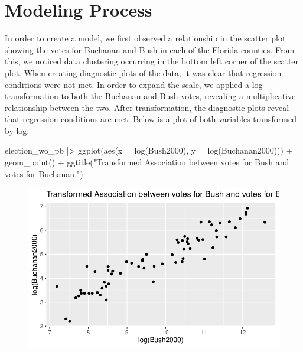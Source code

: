 \documentclass[
  letterpaper,
  DIV=11,
  numbers=noendperiod]{scrartcl}
\newenvironment{Shaded}{\begin{snugshade}}{\end{snugshade}}
\newcommand{\AttributeTok}[1]{\textcolor[rgb]{0.40,0.45,0.13}{#1}}
\newcommand{\FunctionTok}[1]{\textcolor[rgb]{0.28,0.35,0.67}{#1}}
\newcommand{\NormalTok}[1]{\textcolor[rgb]{0.00,0.23,0.31}{#1}}
\newcommand{\SpecialCharTok}[1]{\textcolor[rgb]{0.37,0.37,0.37}{#1}}
\newcommand{\StringTok}[1]{\textcolor[rgb]{0.13,0.47,0.30}{#1}}
\begin{document}
\hypertarget{modeling-process}{%
\section{Modeling Process}\label{modeling-process}}

In order to create a model, we first observed a relationship in the
scatter plot showing the votes for Buchanan and Bush in each of the
Florida counties. From this, we noticed data clustering occurring in the
bottom left corner of the scatter plot. When creating diagnostic plots
of the data, it was clear that regression conditions were not met. In
order to expand the scale, we applied a log transformation to both the
Buchanan and Bush votes, revealing a multiplicative relationship between
the two. After transformation, the diagnostic plots reveal that
regression conditions are met. Below is a plot of both variables
transformed by log:

\begin{Shaded}
\begin{Highlighting}[]
\NormalTok{election\_wo\_pb }\SpecialCharTok{|\textgreater{}} \FunctionTok{ggplot}\NormalTok{(}\FunctionTok{aes}\NormalTok{(}\AttributeTok{x =} \FunctionTok{log}\NormalTok{(Bush2000), }\AttributeTok{y =} \FunctionTok{log}\NormalTok{(Buchanan2000))) }\SpecialCharTok{+} \FunctionTok{geom\_point}\NormalTok{() }\SpecialCharTok{+} \FunctionTok{ggtitle}\NormalTok{(}\StringTok{"Transformed Association between votes for Bush and votes for Buchanan."}\NormalTok{)}
\end{Highlighting}
\end{Shaded}

\begin{figure}[H]

{\centering \includegraphics{case_study_1_files/figure-pdf/unnamed-chunk-2-1.pdf}

}

\end{figure}
\end{document}
